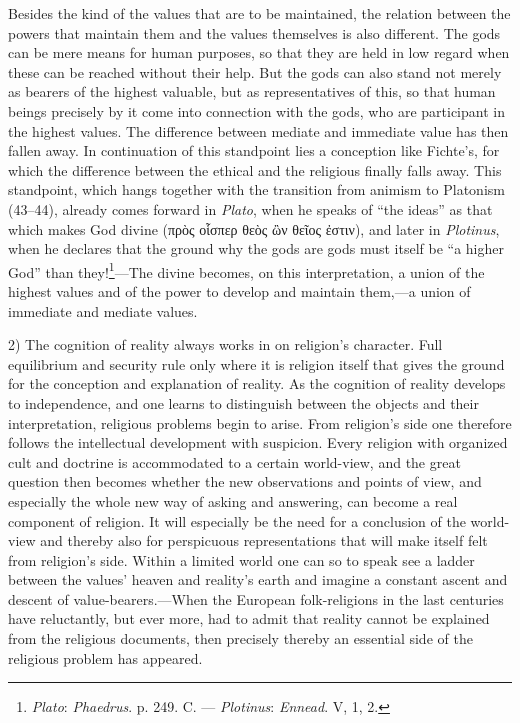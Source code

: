 \documentclass[12pt,a4paper]{book}
\newcommand{\opage}[1]{\marginnote{\footnotesize\textit{[#1]}}}
\begin{document}
Besides the kind of the values that are to be maintained, the relation between the powers that maintain
them and the values themselves is also different. The gods can be mere means for human purposes, so that
they are held in low regard when these can be reached without their help. But the gods can also stand not
merely as bearers of the highest valuable, but as representatives of this, so that human beings precisely
by it come into connection with the gods, who are participant in the highest values. The difference
between mediate and immediate value has then fallen away. In continuation of this standpoint lies a
conception like Fichte's, for which the difference between the ethical and the religious finally falls
away. This standpoint, which hangs together with the transition from animism to Platonism (43--44),
already comes forward in \emph{Plato}, when he speaks of ``the ideas'' as that which makes God divine
(πρὸς οἷσπερ θεὸς ὢν θεῖος ἐστιν), \opage{387}and later in \emph{Plotinus}, when he declares that the ground why the
gods are gods must itself be ``a higher God'' than they!\footnote{\emph{Plato}: \emph{Phaedrus}. p. 249.
C. --- \emph{Plotinus}: \emph{Ennead}. V, 1, 2.}---The divine becomes, on this interpretation, a union of
the highest values and of the power to develop and maintain them,---a union of immediate and mediate
values.

2) The cognition of reality always works in on religion's character. Full equilibrium and security rule
only where it is religion itself that gives the ground for the conception and explanation of reality. As
the cognition of reality develops to independence, and one learns to distinguish between the objects and
their interpretation, religious problems begin to arise. From religion's side one therefore follows the
intellectual development with suspicion. Every religion with organized cult and doctrine is accommodated
to a certain world-view, and the great question then becomes whether the new observations and points of
view, and especially the whole new way of asking and answering, can become a real component of religion.
It will especially be the need for a conclusion of the world-view and thereby also for perspicuous
representations that will make itself felt from religion's side. Within a limited world one can so to speak
see a ladder between the values' heaven and reality's earth and imagine a constant ascent and descent of
value-bearers.---When the European folk-religions in the last centuries have reluctantly, but ever more,
had to admit that reality cannot be explained from the religious documents, then precisely thereby an
essential side of the religious problem has appeared.
\end{document}
